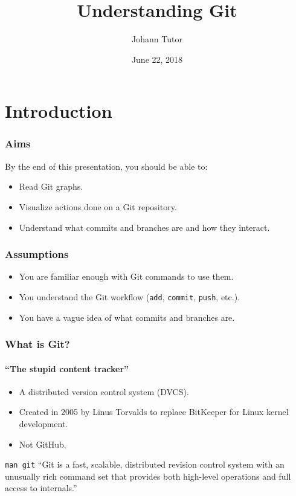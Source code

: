 \documentclass{beamer}
\title{Understanding Git}
\author{Johann Tutor}
\date{June 22, 2018}
\newcommand\gitsubcmd[1]{\texttt{#1}}
\begin{document}

\section{Introduction}

\begin{frame}
  \frametitle{Aims}
  By the end of this presentation, you should be able to:
  \begin{itemize}
    \item Read Git graphs.
    \item Visualize actions done on a Git repository.
    \item Understand what commits and branches are and how they interact.
  \end{itemize}
\end{frame}

\begin{frame}
  \frametitle{Assumptions}
  \begin{itemize}
    \item You are familiar enough with Git commands to use them.
    \item You understand the Git workflow (\gitsubcmd{add}, \gitsubcmd{commit}, \gitsubcmd{push}, etc.).
    \item You have a vague idea of what commits and branches are.
  \end{itemize}
\end{frame}

\begin{frame}
  \frametitle{What is Git?}
  \framesubtitle{``The stupid content tracker''}
  \begin{itemize}
    \item A distributed version control system (DVCS).
    \item Created in 2005 by Linus Torvalds to replace BitKeeper for Linux kernel development.
    \item Not GitHub.
  \end{itemize}
  \vfill
  \begin{block}{\texttt{man git}}
    ``Git is a fast, scalable, distributed revision control system with an
    unusually rich command set that provides both high-level operations and
    full access to internals.''
  \end{block}
\end{frame}
\end{document}
